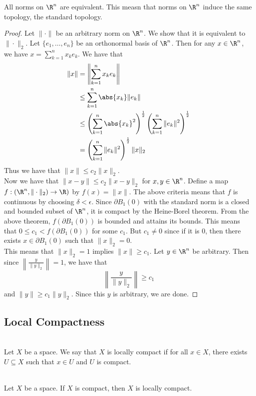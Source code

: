 \documentclass[a4paper]{article}
\begin{document}
\begin{thm}{}{} All norms on $\R^n$ are equivalent. This measn that norms on $\R^n$ induce the same topology, the standard topology. 
\begin{proof}
Let $\|\cdot\|$ be an arbitrary norm on $\R^n$. We show that it is equivalent to $\|\cdot\|_2$. Let $\{e_1,\dots,e_n\}$ be an orthonormal basis of $\R^n$. Then for any $x\in\R^n$, we have $x=\sum_{k=1}^nx_ke_k$. We have that 
\begin{align*}
\|x\|&=\left\|\sum_{k=1}^nx_ke_k\right\|\\
&\leq\sum_{k=1}^n\abs{x_k}\|e_k\|\\
&\leq\left(\sum_{k=1}^n\abs{x_k}^2\right)^{\frac{1}{2}}\left(\sum_{k=1}^n\|e_k\|^2\right)^{\frac{1}{2}}\\
&=\left(\sum_{k=1}^n\|e_k\|^2\right)^{\frac{1}{2}}\|x\|_2
\end{align*}
Thus we have that $\|x\|\leq c_2\|x\|_2$. \\
Now we have that $\|x-y\|\leq c_2\|x-y\|_2$ for $x,y\in\R^n$. Define a map $f:(\R^n,\|\cdot\|_2)\to\R)$ by $f(x)=\|x\|$. The above criteria means that $f$ is continuous by choosing $\delta<\epsilon$. Since $\partial B_1(0)$ with the standard norm is a closed and bounded subset of $\R^n$, it is compact by the Heine-Borel theorem. From the above theorem, $f(\partial B_1(0))$ is bounded and attains its bounds. This means that $0\leq c_1<f(\partial B_1(0))$ for some $c_1$. But $c_1\neq 0$ since if it is $0$, then there exists $x\in\partial B_1(0)$ such that $\|x\|_2=0$. \\
This means that $\|x\|_2=1$ implies $\|x\|\geq c_1$. Let $y\in\R^n$ be arbitrary. Then since $\left\|\frac{y}{\|y\|_2}\right\|=1$, we have that $$\left\|\frac{y}{\|y\|_2}\right\|\geq c_1$$ and $\|y\|\geq c_1\|y\|_2$. Since this $y$ is arbitrary, we are done. 
\end{proof}
\end{thm}

\subsection{Local Compactness}
\begin{defn}{}{}\\
Let $X$ be a space. We say that $X$ is locally compact if for all $x\in X$, there exists $U\subseteq X$ such that $x\in U$ and $U$ is compact. 
\end{defn}

\begin{lmm}{}{}\\
Let $X$ be a space. If $X$ is compact, then $X$ is locally compact. 
\end{lmm}
\end{document}
